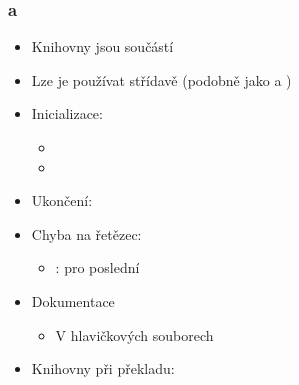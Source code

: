 \begin{frame}
  \frametitle{ a }

  \begin{itemize}
    \item Knihovny jsou součástí 
    \item Lze je používat střídavě (podobně jako  a )

    \pause

    \item Inicializace: 
    \begin{itemize}
      \item {}
      \item {}
    \end{itemize}

    \pause

    \item Ukončení: 

    \pause

    \item Chyba na řetězec: 
    \begin{itemize}
      \item {}:  pro poslední
    \end{itemize}

    \pause

    \item Dokumentace
    \begin{itemize}
      \item V hlavičkových souborech
    \end{itemize}

    \item Knihovny při překladu: 
  \end{itemize}

\end{frame}

